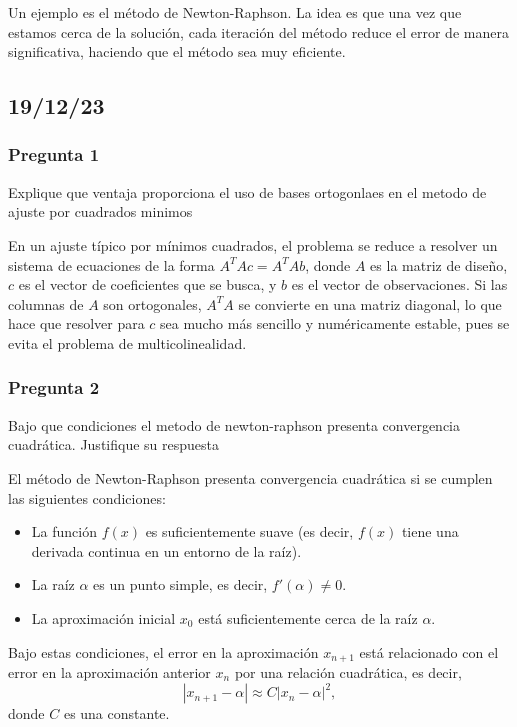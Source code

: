 Un ejemplo es el método de Newton-Raphson. La idea es que una vez que estamos cerca de la solución, cada iteración del método reduce el error de manera significativa, haciendo que el método sea muy eficiente.


\subsection{19/12/23}
\subsubsection{Pregunta 1}
Explique que ventaja proporciona el uso de bases ortogonlaes en el metodo de ajuste por cuadrados minimos

En un ajuste típico por mínimos cuadrados, el problema se reduce a resolver un sistema de ecuaciones de la forma $A^TAc = A^TAb $, donde $A$ es la matriz de diseño, $c$ es el vector de coeficientes que se busca, y $b$ es el vector de observaciones. Si las columnas de $A$ son ortogonales, $A^TA$ se convierte en una matriz diagonal, lo que hace que resolver para $c$ sea mucho más sencillo y numéricamente estable, pues se evita el problema de multicolinealidad.

\subsubsection{Pregunta 2}
Bajo que condiciones el metodo de newton-raphson presenta convergencia cuadrática. Justifique su respuesta

El método de Newton-Raphson presenta convergencia cuadrática si se cumplen las siguientes condiciones:
\begin{itemize}
\item La función \( f(x) \) es suficientemente suave (es decir, \( f(x) \) tiene una derivada continua en un entorno de la raíz).
\item La raíz \( \alpha \) es un punto simple, es decir, \( f'(\alpha) \neq 0 \).
\item La aproximación inicial \( x_0 \) está suficientemente cerca de la raíz \( \alpha \).
\end{itemize}

Bajo estas condiciones, el error en la aproximación \( x_{n+1} \) está relacionado con el error en la aproximación anterior \( x_n \) por una relación cuadrática, es decir, 
\[ 
|x_{n+1} - \alpha| \approx C|x_n - \alpha|^2,
\]
donde \( C \) es una constante.
